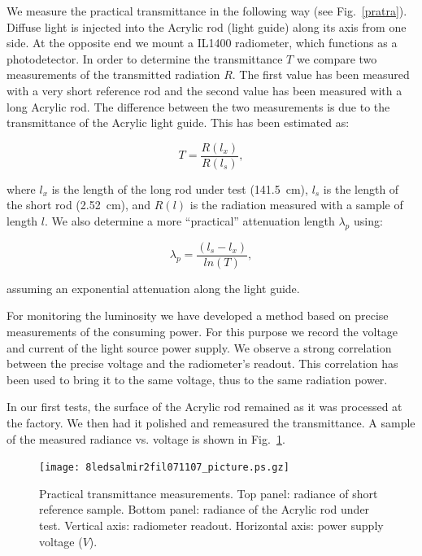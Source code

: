 We measure the practical transmittance in the following way (see Fig.~\ref{pratra}).
Diffuse light is injected into the Acrylic rod (light guide) along its axis from 
one side.  At the opposite end we mount a IL1400 radiometer, which functions as a 
photodetector.  In order to determine the transmittance $T$ we compare two 
measurements of the transmitted radiation $R$.  The first value has been measured  
with a very short reference rod and the second value has been measured with a long 
Acrylic rod.  The difference between the two measurements is due to the transmittance 
of the Acrylic light guide.  This has been estimated as:  

\begin{equation}
T = \frac{R(l_x)}{R(l_s)},
\label{trans}
\end{equation}

\noindent
where $l_x$ is the length of the long rod under test (141.5~cm), $l_s$ is the length 
of the short rod (2.52~cm), and $R(l)$ is the radiation measured with a sample of
length $l$.  We also determine a more ``practical'' attenuation length $\lambda_p$ 
using:

\begin{equation}
\lambda_p= \frac{(l_s-l_x)}{ln(T)},
\label{pracat}
\end{equation}

\noindent
assuming an exponential attenuation along the light guide.
 
For monitoring the luminosity we have developed a method based on precise 
measurements of the consuming power.  For this purpose we record the voltage 
and current of the light source power supply.  We observe a strong correlation 
between the precise voltage and the radiometer's readout.  This correlation has 
been used to bring it to the same voltage, thus to the same radiation power. 

In our first tests, the surface of the Acrylic rod remained as it was processed  
at the factory.  We then had it polished and remeasured the transmittance.
A sample of the measured radiance vs. voltage is shown in Fig.~\ref{leds8}.

\begin{figure}[htbp]
\begin{center}
\texttt{[image: 8ledsalmir2fil071107\_picture.ps.gz]}
\end{center}
\caption{\small{Practical transmittance measurements.  Top panel: radiance 
of short reference sample.  Bottom panel: radiance of the Acrylic rod under test.
Vertical axis: radiometer readout.  Horizontal axis: power supply voltage ($V$).}}
\label{leds8}
\end{figure}

